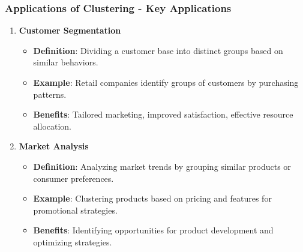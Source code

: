 \documentclass[aspectratio=169]{beamer}
\begin{document}
\begin{frame}[fragile]
  \frametitle{Applications of Clustering - Key Applications}
  \begin{enumerate}
    \item \textbf{Customer Segmentation}
      \begin{itemize}
        \item \textbf{Definition}: Dividing a customer base into distinct groups based on similar behaviors.
        \item \textbf{Example}: Retail companies identify groups of customers by purchasing patterns.
        \item \textbf{Benefits}: Tailored marketing, improved satisfaction, effective resource allocation.
      \end{itemize}

    \item \textbf{Market Analysis}
      \begin{itemize}
        \item \textbf{Definition}: Analyzing market trends by grouping similar products or consumer preferences.
        \item \textbf{Example}: Clustering products based on pricing and features for promotional strategies.
        \item \textbf{Benefits}: Identifying opportunities for product development and optimizing strategies.
      \end{itemize}
  \end{enumerate}
\end{frame}
\end{document}
